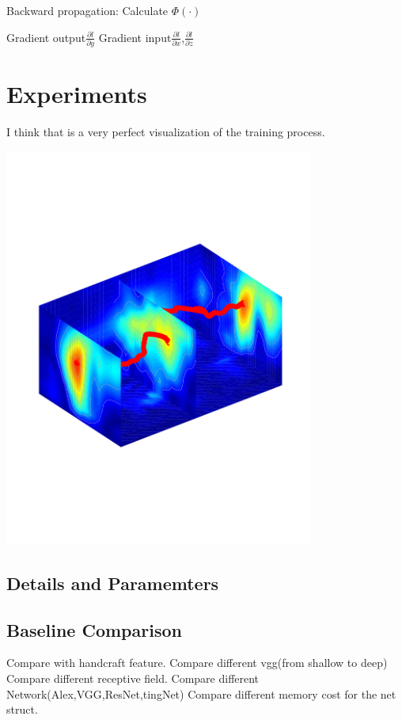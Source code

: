 \documentclass[11pt]{article}
\begin{document}
\begin{algorithm}
\caption{Backward propagation: Calculate $\Phi(\cdot)$}
\begin{algorithmic} 
\REQUIRE Gradient output$\frac{\partial l}{\partial y}$
\RETURN Gradient input$\frac{\partial l}{\partial x}$,$\frac{\partial l}{\partial z}$

\end{algorithmic}
\end{algorithm}




\section{Experiments}

I think that is a very perfect visualization of the training process.

\begin{center}
\includegraphics[width=4in,trim = 0mm 65mm 0mm 65mm, clip]{./img/visual_training.pdf}
\end{center}

\subsection{Details and Paramemters}


\subsection{Baseline Comparison}
Compare with handcraft feature.
Compare different vgg(from shallow to deep)
Compare different receptive field.
Compare different Network(Alex,VGG,ResNet,tingNet)
Compare different memory cost for the net struct.
\end{document}
